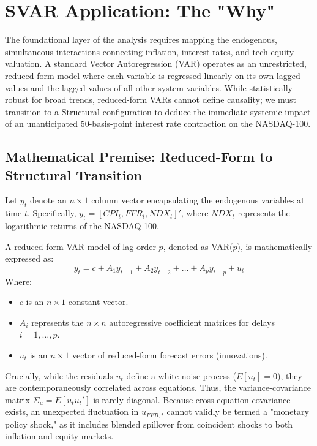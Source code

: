 \documentclass[12pt,a4paper]{report}
\begin{document}
\section{SVAR Application: The "Why"}
The foundational layer of the analysis requires mapping the endogenous, simultaneous interactions connecting inflation, interest rates, and tech-equity valuation. A standard Vector Autoregression (VAR) operates as an unrestricted, reduced-form model where each variable is regressed linearly on its own lagged values and the lagged values of all other system variables. While statistically robust for broad trends, reduced-form VARs cannot define causality; we must transition to a Structural configuration to deduce the immediate systemic impact of an unanticipated 50-basis-point interest rate contraction on the NASDAQ-100.

\subsection{Mathematical Premise: Reduced-Form to Structural Transition}
Let $y_t$ denote an $n \times 1$ column vector encapsulating the endogenous variables at time $t$. Specifically, $y_t = [CPI_t, FFR_t, NDX_t]'$, where $NDX_t$ represents the logarithmic returns of the NASDAQ-100.

A reduced-form VAR model of lag order $p$, denoted as VAR($p$), is mathematically expressed as:
\begin{equation}
y_t = c + A_1 y_{t-1} + A_2 y_{t-2} + \dots + A_p y_{t-p} + u_t
\end{equation}
Where:
\begin{itemize}
    \item $c$ is an $n \times 1$ constant vector.
    \item $A_i$ represents the $n \times n$ autoregressive coefficient matrices for delays $i = 1, \dots, p$.
    \item $u_t$ is an $n \times 1$ vector of reduced-form forecast errors (innovations).
\end{itemize}

Crucially, while the residuals $u_t$ define a white-noise process ($E[u_t] = 0$), they are contemporaneously correlated across equations. Thus, the variance-covariance matrix $\Sigma_u = E[u_t u_t']$ is rarely diagonal. Because cross-equation covariance exists, an unexpected fluctuation in $u_{FFR,t}$ cannot validly be termed a "monetary policy shock," as it includes blended spillover from coincident shocks to both inflation and equity markets.
\end{document}
